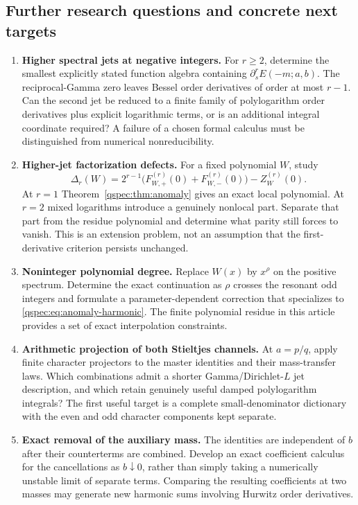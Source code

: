 \subsection{Further research questions and concrete next targets}
\begin{enumerate}
\item \textbf{Higher spectral jets at negative integers.}
For $r\ge2$, determine the smallest explicitly stated function algebra
containing $\partial_s^rE(-m;a,b)$. The reciprocal-Gamma zero leaves
Bessel order derivatives of order at most $r-1$. Can the second jet be
reduced to a finite family of polylogarithm order derivatives plus
explicit logarithmic terms, or is an additional integral coordinate
required? A failure of a chosen formal calculus must be distinguished
from numerical nonreducibility.

\item \textbf{Higher-jet factorization defects.}
For a fixed polynomial $W$, study
\[
\Delta_r(W)=2^{r-1}\bigl(F_{W,+}^{(r)}(0)+F_{W,-}^{(r)}(0)\bigr)
-Z_W^{(r)}(0).
\]
At $r=1$ Theorem~\ref{qspec:thm:anomaly} gives an exact local polynomial.
At $r=2$ mixed logarithms introduce a genuinely nonlocal part. Separate
that part from the residue polynomial and determine what parity still
forces to vanish. This is an extension problem, not an assumption that
the first-derivative criterion persists unchanged.

\item \textbf{Noninteger polynomial degree.}
Replace $W(x)$ by $x^\rho$ on the positive spectrum. Determine the exact
continuation as $\rho$ crosses the resonant odd integers and formulate a
parameter-dependent correction that specializes to
\eqref{qspec:eq:anomaly-harmonic}. The finite polynomial residue in this
article provides a set of exact interpolation constraints.

\item \textbf{Arithmetic projection of both Stieltjes channels.}
At $a=p/q$, apply finite character projectors to the master identities
and their mass-transfer laws. Which combinations admit a shorter
Gamma/Dirichlet-$L$ jet description, and which retain genuinely useful
damped polylogarithm integrals? The first useful target is a complete
small-denominator dictionary with the even and odd character components
kept separate.

\item \textbf{Exact removal of the auxiliary mass.}
The identities are independent of $b$ after their counterterms are
combined. Develop an exact coefficient calculus for the cancellations
as $b\downarrow0$, rather than simply taking a numerically unstable
limit of separate terms. Comparing the resulting coefficients at two
masses may generate new harmonic sums involving Hurwitz order derivatives.


\end{enumerate}
